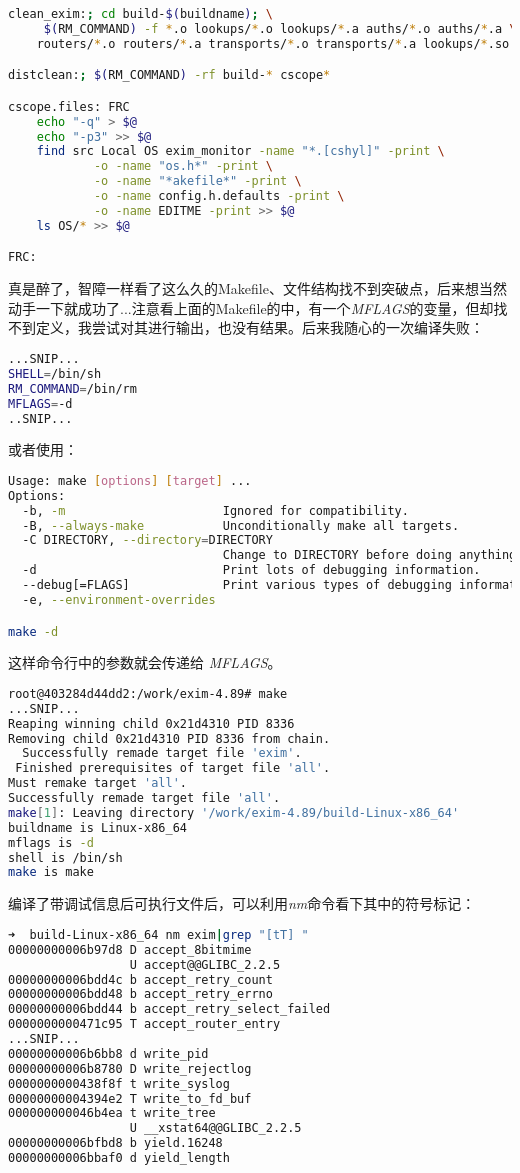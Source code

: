 \documentclass[12pt]{article}  %
\begin{document}
\begin{lstlisting}[language=sh]
clean_exim:; cd build-$(buildname); \
	 $(RM_COMMAND) -f *.o lookups/*.o lookups/*.a auths/*.o auths/*.a \
	routers/*.o routers/*.a transports/*.o transports/*.a lookups/*.so

distclean:; $(RM_COMMAND) -rf build-* cscope*

cscope.files: FRC
	echo "-q" > $@
	echo "-p3" >> $@
	find src Local OS exim_monitor -name "*.[cshyl]" -print \
		    -o -name "os.h*" -print \
		    -o -name "*akefile*" -print \
		    -o -name config.h.defaults -print \
		    -o -name EDITME -print >> $@
	ls OS/* >> $@

FRC:


\end{lstlisting}\par
真是醉了，智障一样看了这么久的Makefile、文件结构找不到突破点，后来想当然动手一下就成功了...注意看上面的Makefile的中，有一个\emph{MFLAGS}的变量，但却找不到定义，我尝试对其进行输出，也没有结果。后来我随心的一次编译失败：
\begin{lstlisting}[language=sh]
...SNIP...
SHELL=/bin/sh
RM_COMMAND=/bin/rm
MFLAGS=-d
..SNIP...
\end{lstlisting}
或者使用：
\begin{lstlisting}[language=sh]
Usage: make [options] [target] ...
Options:
  -b, -m                      Ignored for compatibility.
  -B, --always-make           Unconditionally make all targets.
  -C DIRECTORY, --directory=DIRECTORY
                              Change to DIRECTORY before doing anything.
  -d                          Print lots of debugging information.
  --debug[=FLAGS]             Print various types of debugging information.
  -e, --environment-overrides

make -d
\end{lstlisting}
这样命令行中的参数就会传递给 \emph{MFLAGS}。
\begin{lstlisting}[language=sh]
root@403284d44dd2:/work/exim-4.89# make
...SNIP...
Reaping winning child 0x21d4310 PID 8336 
Removing child 0x21d4310 PID 8336 from chain.
  Successfully remade target file 'exim'.
 Finished prerequisites of target file 'all'.
Must remake target 'all'.
Successfully remade target file 'all'.
make[1]: Leaving directory '/work/exim-4.89/build-Linux-x86_64'
buildname is Linux-x86_64
mflags is -d
shell is /bin/sh
make is make

\end{lstlisting}
编译了带调试信息后可执行文件后，可以利用\emph{nm}命令看下其中的符号标记：
\begin{lstlisting}[language=sh]
➜  build-Linux-x86_64 nm exim|grep "[tT] "
00000000006b97d8 D accept_8bitmime
                 U accept@@GLIBC_2.2.5
00000000006bdd4c b accept_retry_count
00000000006bdd48 b accept_retry_errno
00000000006bdd44 b accept_retry_select_failed
0000000000471c95 T accept_router_entry
...SNIP...
00000000006b6bb8 d write_pid
00000000006b8780 D write_rejectlog
0000000000438f8f t write_syslog
00000000004394e2 T write_to_fd_buf
000000000046b4ea t write_tree
                 U __xstat64@@GLIBC_2.2.5
00000000006bfbd8 b yield.16248
00000000006bbaf0 d yield_length
\end{lstlisting}
\end{document}
